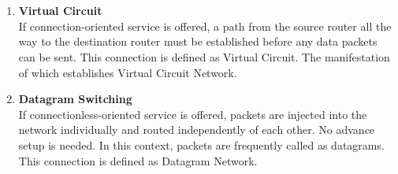 \documentclass[12pt]{article}
\begin{document}
\maketitle

\section{}

\begin{enumerate}[label=(\alph*)]
    \item \textbf{Virtual Circuit} \\
    If connection-oriented service is offered, a path from the source router all the way to the destination router must be established before any data packets can be sent. This connection is defined as Virtual Circuit. The manifestation of which establishes Virtual Circuit Network.
    
    \item \textbf{Datagram Switching} \\
    If connectionless-oriented service is offered, packets are injected into the network individually and routed independently of each other. No advance setup is needed. In this context, packets are frequently called as datagrams. This connection is defined as Datagram Network.
    

\end{enumerate}
\end{document}

